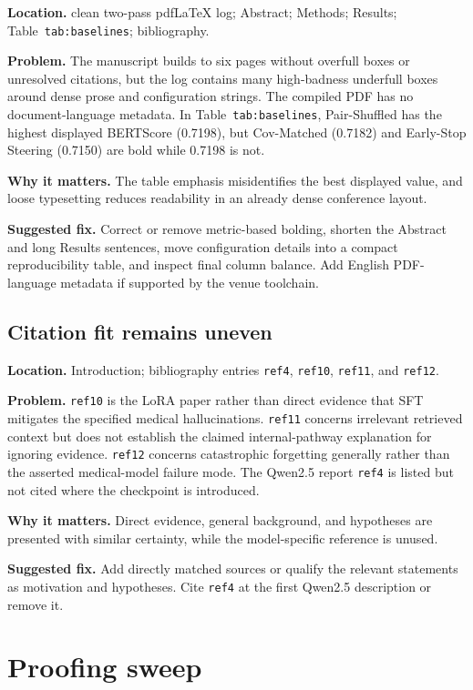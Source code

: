 \documentclass[11pt]{article}
\newcommand{\findinglabel}[1]{\textbf{#1}}
\begin{document}
\findinglabel{Location.} clean two-pass pdfLaTeX log; Abstract; Methods; Results; Table~\texttt{tab:baselines}; bibliography.

\findinglabel{Problem.} The manuscript builds to six pages without overfull boxes or unresolved citations, but the log contains many high-badness underfull boxes around dense prose and configuration strings.  The compiled PDF has no document-language metadata.  In Table~\texttt{tab:baselines}, Pair-Shuffled has the highest displayed BERTScore (0.7198), but Cov-Matched (0.7182) and Early-Stop Steering (0.7150) are bold while 0.7198 is not.

\findinglabel{Why it matters.} The table emphasis misidentifies the best displayed value, and loose typesetting reduces readability in an already dense conference layout.

\findinglabel{Suggested fix.} Correct or remove metric-based bolding, shorten the Abstract and long Results sentences, move configuration details into a compact reproducibility table, and inspect final column balance.  Add English PDF-language metadata if supported by the venue toolchain.

\subsection*{Citation fit remains uneven}

\findinglabel{Location.} Introduction; bibliography entries \texttt{ref4}, \texttt{ref10}, \texttt{ref11}, and \texttt{ref12}.

\findinglabel{Problem.} \texttt{ref10} is the LoRA paper rather than direct evidence that SFT mitigates the specified medical hallucinations.  \texttt{ref11} concerns irrelevant retrieved context but does not establish the claimed internal-pathway explanation for ignoring evidence.  \texttt{ref12} concerns catastrophic forgetting generally rather than the asserted medical-model failure mode.  The Qwen2.5 report \texttt{ref4} is listed but not cited where the checkpoint is introduced.

\findinglabel{Why it matters.} Direct evidence, general background, and hypotheses are presented with similar certainty, while the model-specific reference is unused.

\findinglabel{Suggested fix.} Add directly matched sources or qualify the relevant statements as motivation and hypotheses.  Cite \texttt{ref4} at the first Qwen2.5 description or remove it.

\section*{Proofing sweep}
\end{document}
